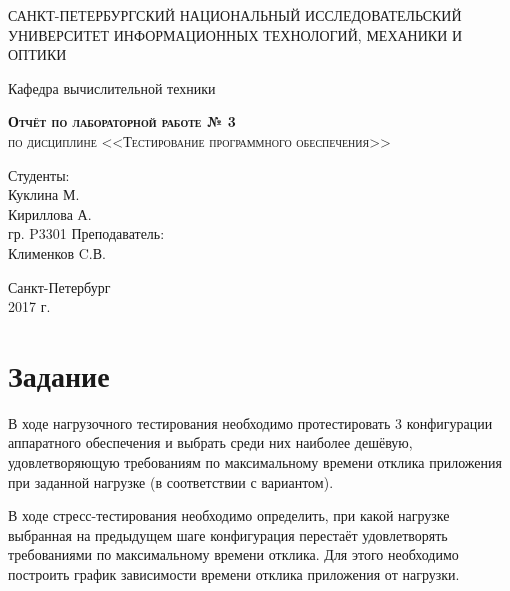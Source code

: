 \documentclass[a4paper,10pt]{article}
\begin{document}
    \begin{titlepage}
        \begin{center}
            \large
            САНКТ-ПЕТЕРБУРГСКИЙ НАЦИОНАЛЬНЫЙ ИССЛЕДОВАТЕЛЬСКИЙ УНИВЕРСИТЕТ ИНФОРМАЦИОННЫХ ТЕХНОЛОГИЙ, МЕХАНИКИ И ОПТИКИ \\
            \vspace{3cm}

            Кафедра вычислительной техники
            \vspace{4cm}

            \textsc{ \textbf{Отчёт по лабораторной работе  № 3} \\
            по дисциплине <<Тестирование программного обеспечения>>\\}

            \bigskip
        \end{center}
        \vspace{3cm}

        \hfill\begin{flushright}
             Студенты: \\ Куклина М. \\ Кириллова А. \\ гр. P3301
             \vfill
             Преподаватель: \\ Клименков C.В. 
        \end{flushright}
        \vfill
        \vfill
        \vfill
        \vfill
        \vfill
        \begin{center}
            Санкт-Петербург \\ 2017 г.
        \end{center}
    \end{titlepage}
\newpage

\section*{Задание}

    В ходе нагрузочного тестирования необходимо протестировать 3 конфигурации аппаратного обеспечения и выбрать среди них наиболее дешёвую, удовлетворяющую требованиям по максимальному времени отклика приложения при заданной нагрузке (в соответствии с вариантом).

    В ходе стресс-тестирования необходимо определить, при какой нагрузке выбранная на предыдущем шаге конфигурация перестаёт удовлетворять требованиями по максимальному времени отклика. Для этого необходимо построить график зависимости времени отклика приложения от нагрузки.
	
\end{document}
